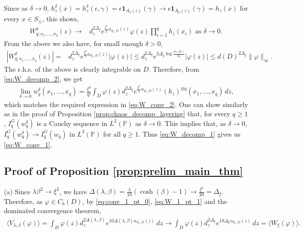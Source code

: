 \documentclass[a4paper, 11pt, reqno]{amsart}
\theoremstyle{definition} \newtheorem{defn}{Definition}[section]
\theoremstyle{remark} \newtheorem{rem}[defn]{Remark}
\theoremstyle{remark} \newtheorem*{rem*}{Remark}
\theoremstyle{plain} \newtheorem{thm}[defn]{Theorem}
\theoremstyle{plain} \newtheorem{lem}[defn]{Lemma}
\theoremstyle{plain} \newtheorem{prop}[defn]{Proposition}
\theoremstyle{plain} \newtheorem{cor}[defn]{Corollary}
\theoremstyle{remark} \newtheorem{exm}[defn]{\textbf{Example}}
\theoremstyle{remark} \newtheorem{exms}[defn]{\textbf{Examples}}
\theoremstyle{remark} \newtheorem*{bl}{}
\numberwithin{equation}{section} %
\newcommand{\pr}{\mathbb{P}}
\newcommand{\ind}{\mathbf{1}}
\begin{document}
		Since as $\delta \to 0$, $h^{\delta}_z (x) = h^{\delta}_z (\epsilon, \gamma) = \epsilon \ind_{A_{\delta}(z)}(\gamma) \to \epsilon \ind_{A_0(z)}(\gamma) = h_z(x)$ for every $x \in S_{\pm}$, this shows,
		\begin{align}
			W^{\delta}_{q;x_1,\ldots, x_q}(z) \to & d_z^{2\Delta_{\xi}} e^{\frac{\xi^2}{2} \alpha_{ d_z, D}(z)}  \varphi(z) \prod_{i=1}^q h_z(x_i) \text{ as } \delta \to 0.
		\end{align}
		From the above we also have, for small enough $\delta>0$,
		\begin{align}\label{eq:W_decomp_4}
			|W^{\delta}_{q;x_1,\ldots, x_q}(z) | = & d_z^{2\Delta_{\xi}} e^{\frac{\xi^2}{2} \alpha_{ d_z, D}(z)}  |\varphi(z)|
			\le     d_z^{2\Delta_{\xi}} e^{2\Delta_{\xi} \log\frac{d(D)}{d_z} }  |\varphi(z)|
            \le  d(D)^{2\Delta_{\xi}} \lVert \varphi\rVert_{\infty}.
		\end{align}
		The r.h.s. of the above is clearly integrable on $D$. Therefore, from \eqref{eq:W_decomp_2}, we get
		\begin{align}
			\lim_{\delta \to 0} w^{ \delta}_q(x_1, \ldots, x_q) 
            = 
			     \frac{\xi^q}{q!} \int_D \varphi(z) d_z^{2\Delta_{\xi}} e^{\frac{\xi^2}{2} \alpha_{ d_z, D}(z)}  (h_z)^{\otimes q} (x_1, \ldots, x_q) \, dz,
		\end{align}
		which matches the required expression in \eqref{eq:W_conv_2}. One can show similarly as in the proof of Proposition \ref{prop:chaos_decomp_layering} that, for every $q\ge 1$, $I^{G}_q(w^{\delta}_q)$ is a Cauchy sequence in $L^2(\pr)$ as $\delta \to 0$. This implies that, as $\delta \to 0$, $I^G_q(w^{\delta}_q) \to I^G_q(w_q)$ in $L^2(\pr)$ for all $q\ge 1$. Thus \eqref{eq:W_decomp_1} gives us \eqref{eq:W_conv_1}.

        

    \subsection{Proof of Proposition \ref{prop:prelim_main_thm}} \label{app:proof_prop:prelim_main_thm}
		(a) Since $\lambda \beta^2 \to \xi^2$, we have $\Delta(\lambda, \beta) = \frac{\lambda}{10}(\cosh(\beta) -1) \to \frac{\xi^2}{20} = \Delta_{\xi}$. Therefore, as $\varphi \in C_b(D)$, by \eqref{eq:conv_1_pt_0}, \eqref{eq:W_1_pt_1} and the dominated convergence theorem,
		\begin{align}
			\langle V_{\lambda, \beta}(\varphi)\rangle =  \int_D \varphi(z) d_z^{2\Delta(\lambda, \beta)} e^{10\Delta(\lambda, \beta) \alpha_{d_z, D}(z)} \, dz	
			\to  \int_D \varphi(z) d_z^{2\Delta_{\xi}} e^{10\Delta_{\xi} \alpha_{d_z, D}(z)} \, dz = \langle  W_{\xi}(\varphi)\rangle.
		\end{align}
        
\end{document}
